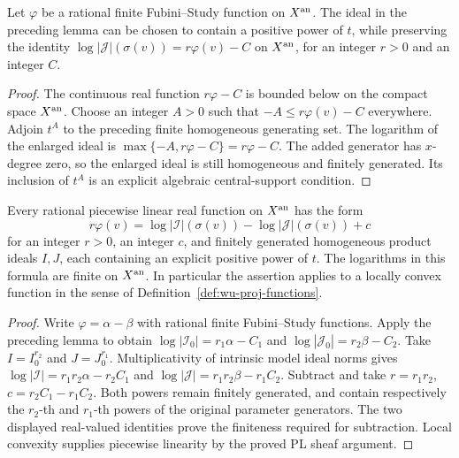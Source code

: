 \begin{lemma}
\label{lem:pl-vertical-truncation}
\leanok
Let $\varphi$ be a rational finite Fubini--Study function on $X^{\rm an}$.
The ideal in the preceding lemma can be chosen to contain a positive power
of $t$, while preserving the identity
$\log|\mathcal J|(\sigma(v))=r\varphi(v)-C$ on $X^{\rm an}$, for an integer
$r>0$ and an integer $C$.
\end{lemma}
\begin{proof}
The continuous real function $r\varphi-C$ is bounded below on the compact
space $X^{\rm an}$.  Choose an integer $A>0$ such that
$-A\le r\varphi(v)-C$ everywhere.  Adjoin $t^A$ to the preceding finite
homogeneous generating set.  The logarithm of the enlarged ideal is
$\max\{-A,r\varphi-C\}=r\varphi-C$.  The added generator has $x$-degree
zero, so the enlarged ideal is still homogeneous and finitely generated.
Its inclusion of $t^A$ is an explicit algebraic central-support condition.
\end{proof}

\begin{proposition}
\label{prop:pl-vertical-ideal-models}
\leanok
Every rational piecewise linear real function on $X^{\rm an}$ has the form
\[
 r\varphi(v)=\log|\mathcal I|(\sigma(v))
             -\log|\mathcal J|(\sigma(v))+c
\]
for an integer $r>0$, an integer $c$, and finitely generated homogeneous
product ideals $I,J$, each containing an explicit positive power of $t$.
The logarithms in this formula are finite on $X^{\rm an}$.  In particular
the assertion applies to a locally convex function in the sense of
Definition~\ref{def:wu-proj-functions}.
\end{proposition}
\begin{proof}
Write $\varphi=\alpha-\beta$ with rational finite Fubini--Study functions.
Apply the preceding lemma to obtain
$\log|\mathcal I_0|=r_1\alpha-C_1$ and
$\log|\mathcal J_0|=r_2\beta-C_2$.
Take $I=I_0^{r_2}$ and $J=J_0^{r_1}$.  Multiplicativity of intrinsic model
ideal norms gives
$\log|\mathcal I|=r_1r_2\alpha-r_2C_1$ and
$\log|\mathcal J|=r_1r_2\beta-r_1C_2$.
Subtract and take $r=r_1r_2$, $c=r_2C_1-r_1C_2$.
Both powers remain finitely generated, and contain respectively the
$r_2$-th and $r_1$-th powers of the original parameter generators.
The two displayed real-valued identities prove the finiteness required
for subtraction.  Local convexity supplies piecewise linearity by the
proved PL sheaf argument.
\end{proof}

